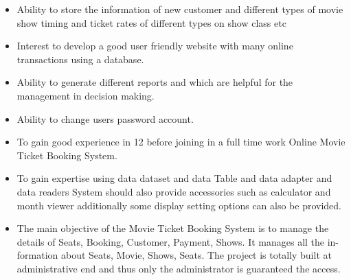 \documentclass[oneside,a4paper,12pt]{report}
\begin{document}
\begin{itemize}
    \item Ability to store the information of new customer and different types of movie show timing and ticket rates of different types on show class etc
    \item Interest to develop a good user friendly website with many online transactions using a database.
    \item Ability to generate different reports and which are helpful for the management in decision making.
    \item Ability to change users password account. 
    \item To gain good experience in 12 before joining in a full time work Online Movie Ticket Booking System. 
    \item To gain expertise using data dataset and data Table and data adapter and data readers System should also provide accessories such as calculator and month viewer additionally some display setting options can also be provided. 
    \item The main objective of the Movie Ticket Booking System is to manage the details of Seats, Booking, Customer, Payment, Shows. It manages all the in- formation about Seats, Movie, Shows, Seats. The project is totally built at administrative end and thus only the administrator is guaranteed the access. 
\end{itemize}
\end{document}
